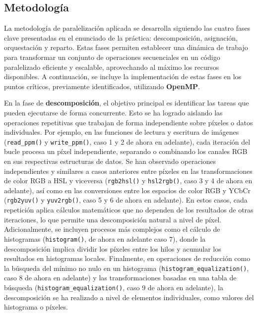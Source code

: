 \subsection{Metodología}
La metodología de paralelización aplicada se desarrolla siguiendo las cuatro fases clave presentadas en el enunciado de la práctica: descomposición, asignación, orquestación y reparto. Estas fases permiten establecer una dinámica de trabajo para transformar un conjunto de operaciones secuenciales en un código paralelizado eficiente y escalable, aprovechando al máximo los recursos disponibles. A continuación, se incluye la implementación de estas fases en los puntos críticos, previamente identificados, utilizando \textbf{OpenMP}.

En la fase de \textbf{descomposición}, el objetivo principal es identificar las tareas que pueden ejecutarse de forma concurrente. Esto se ha logrado aislando las operaciones repetitivas que trabajan de forma independiente sobre píxeles o datos individuales. Por ejemplo, en las funciones de lectura y escritura de imágenes (\texttt{read\_ppm()} y \texttt{write\_ppm()}, caso 1 y 2 de ahora en adelante), cada iteración del bucle procesa un píxel independiente, separando o combinando los canales RGB en sus respectivas estructuras de datos. Se han observado operaciones independientes y similares a casos anteriores entre píxeles en las transformaciones de color RGB a HSL y viceversa (\texttt{rgb2hsl()} y \texttt{hsl2rgb()}, caso 3 y 4 de ahora en adelante), así como en las conversiones entre los espacios de color RGB y YCbCr (\texttt{rgb2yuv()} y \texttt{yuv2rgb()}, caso 5 y 6 de ahora en adelante). En estos casos, cada repetición aplica cálculos matemáticos que no dependen de los resultados de otras iteraciones, lo que permite una descomposición natural a nivel de píxel.
Adicionalmente, se incluyen procesos más complejos como el cálculo de histogramas (\texttt{histogram()}, de ahora en adelante caso 7), donde la descomposición implica dividir los píxeles entre los hilos y acumular los resultados en histogramas locales. Finalmente, en operaciones de reducción como la búsqueda del mínimo no nulo en un histograma (\texttt{histogram\_equalization()}, caso 8 de ahora en adelante) y las transformaciones basadas en una tabla de búsqueda (\texttt{histogram\_equalization()}, caso 9 de ahora en adelante), la descomposición se ha realizado a nivel de elementos individuales, como valores del histograma o píxeles.

